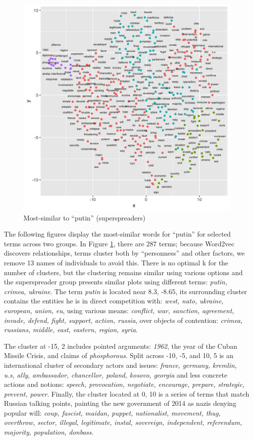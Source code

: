 \begin{figure}[!ht]
\centering
\includegraphics[width=\textwidth]{rus/superspreader_putin}
\caption{Most-similar to ``putin'' (superspreaders)}
\label{fig:superspreader_putin}
\end{figure}

The following figures display the most-similar words for ``putin'' for selected terms across two groups.
In Figure \ref{fig:superspreader_putin}, there are 287 terms; because Word2vec discovers relationships, terms cluster both by ``personness'' and other factors, we remove 13 names of individuals to avoid this.
There is no optimal k for the number of clusters, but the clustering remains similar using various options and the superspreader group presents similar plots using different terms: \emph{putin, crimea, ukraine}.
The term \emph{putin} is located near 8.3, -8.65, its surrounding cluster contains the entities he is in direct competition with: \emph{west, nato, ukraine, european, union, eu}, using various means: \emph{conflict, war, sanction, agreement, invade, defend, fight, support, action, russia}, over objects of contention: \emph{crimea, russians, middle, east, eastern, region, syria}.

The cluster at -15, 2 includes pointed arguments: \emph{1962}, the year of the Cuban Missile Crisis, and claims of \emph{phosphorous}.
Split across -10, -5, and 10, 5 is an international cluster of secondary actors and issues: \emph{france, germany, kremlin, u.s, ally, ambassador, chancellor, poland, kosovo, georgia} and less concrete actions and notions: \emph{speech, provocation, negotiate, encourage, prepare, strategic, prevent, power}.
Finally, the cluster located at 0, 10 is a series of terms that match Russian talking points, painting the new government of 2014 as nazis denying popular will: \emph{coup, fascist, maidan, puppet, nationalist, movement, thug, overthrow, sector, illegal, legitimate, instal, sovereign, independent, referendum, majority, population, donbass}.


